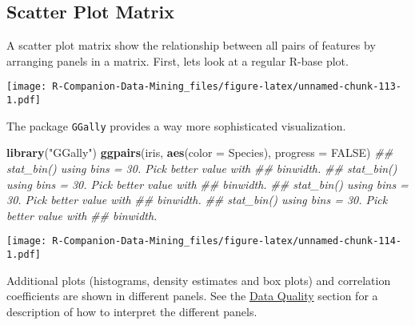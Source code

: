 \documentclass[
  notitlepage]{book}
\newenvironment{Shaded}{\begin{snugshade}}{\end{snugshade}}
\newcommand{\CommentTok}[1]{\textcolor[rgb]{0.56,0.35,0.01}{\textit{#1}}}
\newcommand{\DataTypeTok}[1]{\textcolor[rgb]{0.13,0.29,0.53}{#1}}
\newcommand{\KeywordTok}[1]{\textcolor[rgb]{0.13,0.29,0.53}{\textbf{#1}}}
\newcommand{\NormalTok}[1]{#1}
\newcommand{\OperatorTok}[1]{\textcolor[rgb]{0.81,0.36,0.00}{\textbf{#1}}}
\newcommand{\OtherTok}[1]{\textcolor[rgb]{0.56,0.35,0.01}{#1}}
\newcommand{\StringTok}[1]{\textcolor[rgb]{0.31,0.60,0.02}{#1}}
\begin{document}
\hypertarget{scatter-plot-matrix}{%
\subsection{Scatter Plot Matrix}\label{scatter-plot-matrix}}

A scatter plot matrix show the relationship between all pairs of features
by arranging panels in a matrix. First, lets look at a regular
R-base plot.

\begin{Shaded}
\end{Shaded}

\texttt{[image: R-Companion-Data-Mining\_files/figure-latex/unnamed-chunk-113-1.pdf]}

The package \texttt{GGally} provides a way more sophisticated visualization.

\begin{Shaded}
\begin{Highlighting}[]
\KeywordTok{library}\NormalTok{(}\StringTok{"GGally"}\NormalTok{)}
\KeywordTok{ggpairs}\NormalTok{(iris,  }\KeywordTok{aes}\NormalTok{(}\DataTypeTok{color =}\NormalTok{ Species), }\DataTypeTok{progress =} \OtherTok{FALSE}\NormalTok{)}
\CommentTok{\#\# \textasciigrave{}stat\_bin()\textasciigrave{} using \textasciigrave{}bins = 30\textasciigrave{}. Pick better value with}
\CommentTok{\#\# \textasciigrave{}binwidth\textasciigrave{}.}
\CommentTok{\#\# \textasciigrave{}stat\_bin()\textasciigrave{} using \textasciigrave{}bins = 30\textasciigrave{}. Pick better value with}
\CommentTok{\#\# \textasciigrave{}binwidth\textasciigrave{}.}
\CommentTok{\#\# \textasciigrave{}stat\_bin()\textasciigrave{} using \textasciigrave{}bins = 30\textasciigrave{}. Pick better value with}
\CommentTok{\#\# \textasciigrave{}binwidth\textasciigrave{}.}
\CommentTok{\#\# \textasciigrave{}stat\_bin()\textasciigrave{} using \textasciigrave{}bins = 30\textasciigrave{}. Pick better value with}
\CommentTok{\#\# \textasciigrave{}binwidth\textasciigrave{}.}
\end{Highlighting}
\end{Shaded}

\texttt{[image: R-Companion-Data-Mining\_files/figure-latex/unnamed-chunk-114-1.pdf]}

Additional plots
(histograms, density estimates and box plots) and correlation
coefficients are shown in different panels. See the \protect\hyperlink{data-quality}{Data Quality}
section for a description of how to interpret the different panels.
\end{document}
